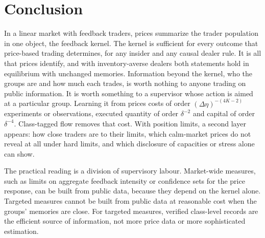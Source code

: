 \section{Conclusion}\label{sec:conclusion}

In a linear market with feedback traders, prices summarize the trader population in one object, the feedback kernel. The kernel is sufficient for every outcome that price-based trading determines, for any insider and any causal dealer rule. It is all that prices identify, and with inventory-averse dealers both statements hold in equilibrium with unchanged memories. Information beyond the kernel, who the groups are and how much each trades, is worth nothing to anyone trading on public information. It is worth something to a supervisor whose action is aimed at a particular group. Learning it from prices costs of order $(\Delta\eta)^{-(4K-2)}$ experiments or observations, executed quantity of order $\delta^{-2}$ and capital of order $\delta^{-4}$. Class-tagged flow removes that cost. With position limits, a second layer appears: how close traders are to their limits, which calm-market prices do not reveal at all under hard limits, and which disclosure of capacities or stress alone can show.

The practical reading is a division of supervisory labour. Market-wide measures, such as limits on aggregate feedback intensity or confidence sets for the price response, can be built from public data, because they depend on the kernel alone. Targeted measures cannot be built from public data at reasonable cost when the groups' memories are close. For targeted measures, verified class-level records are the efficient source of information, not more price data or more sophisticated estimation.
